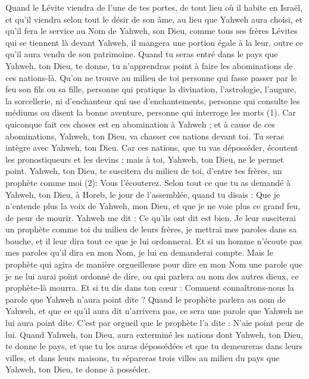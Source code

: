 \begin{multicols}{2}
Quand le Lévite viendra de l’une de tes portes, de tout lieu où il habite en Israël, et qu'il viendra selon tout le désir de son âme, au lieu que Yahweh aura choisi,
et qu’il fera le service au Nom de Yahweh, son Dieu, comme tous ses frères Lévites qui se tiennent là devant Yahweh,
il mangera une portion égale à la leur, outre ce qu'il aura vendu de son patrimoine.
Quand tu seras entré dans le pays que Yahweh, ton Dieu, te donne, tu n'apprendras point à faire les abominations de ces nations-là.
Qu’on ne trouve au milieu de toi personne qui fasse passer par le feu son fils ou sa fille, personne qui pratique la divination, l’astrologie, l’augure, la sorcellerie,
ni d'enchanteur qui use d'enchantements, personne qui consulte les médiums ou disent la bonne aventure, personne qui interroge les morts (1).
Car quiconque fait ces choses est en abomination à Yahweh ; et à cause de ces abominations, Yahweh, ton Dieu, va chasser ces nations devant toi.
Tu seras intègre avec Yahweh, ton Dieu.
Car ces nations, que tu vas déposséder, écoutent les pronostiqueurs et les devins ; mais à toi, Yahweh, ton Dieu, ne le permet point.
Yahweh, ton Dieu, te suscitera du milieu de toi, d'entre tes frères, un prophète comme moi (2): Vous l'écouterez.
Selon tout ce que tu as demandé à Yahweh, ton Dieu, à Horeb, le jour de l'assemblée, quand tu disais : Que je n'entende plus la voix de Yahweh, mon Dieu, et que je ne voie plus ce grand feu, de peur de mourir.
Yahweh me dit : Ce qu’ils ont dit est bien.
Je leur susciterai un prophète comme toi du milieu de leurs frères, je mettrai mes paroles dans sa bouche, et il leur dira tout ce que je lui ordonnerai.
Et si un homme n'écoute pas mes paroles qu’il dira en mon Nom, je lui en demanderai compte.
Mais le prophète qui agira de manière orgueilleuse pour dire en mon Nom une parole que je ne lui aurai point ordonné de dire, ou qui parlera au nom des autres dieux, ce prophète-là mourra.
Et si tu dis dans ton cœur : Comment connaîtrons-nous la parole que Yahweh n'aura point dite ?
Quand le prophète parlera au nom de Yahweh, et que ce qu’il aura dit n’arrivera pas, ce sera une parole que Yahweh ne lui aura point dite. C’est par orgueil que le prophète l'a dite : N’aie point peur de lui.
\VerseOne{}Quand Yahweh, ton Dieu, aura exterminé les nations dont Yahweh, ton Dieu, te donne le pays, et que tu les auras dépossédées et que tu demeureras dans leurs villes, et dans leurs maisons,
tu sépareras trois villes au milieu du pays que Yahweh, ton Dieu, te donne à posséder.

\end{multicols}

